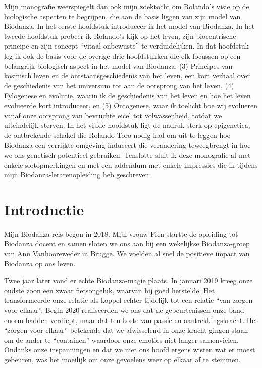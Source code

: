 \documentclass[
  11pt,
]{book}
\begin{document}
Mijn monografie weerspiegelt dan ook mijn zoektocht om Rolando's visie op de biologische aspecten te begrijpen, die aan de basis liggen van zijn model van Biodanza. In het eerste hoofdstuk introduceer ik het model van Biodanza. In het tweede hoofdstuk probeer ik Rolando's kijk op het leven, zijn biocentrische principe en zijn concept ``vitaal onbewuste'' te verduidelijken. In dat hoofdstuk leg ik ook de basis voor de overige drie hoofdstukken die elk focussen op een belangrijk biologisch aspect in het model van Biodanza: (3) Principes van kosmisch leven en de ontstaansgeschiedenis van het leven, een kort verhaal over de geschiedenis van het universum tot aan de oorsprong van het leven, (4) Fylogenese en evolutie, waarin ik de geschiedenis van het leven en hoe het leven evolueerde kort introduceer, en (5) Ontogenese, waar ik toelicht hoe wij evolueren vanaf onze oorsprong van bevruchte eicel tot volwassenheid, totdat we uiteindelijk sterven. In het vijfde hoofdstuk ligt de nadruk sterk op epigenetica, de ontbrekende schakel die Rolando Toro nodig had om uit te leggen hoe Biodanza een verrijkte omgeving induceert die verandering teweegbrengt in hoe we ons genetisch potentieel gebruiken. Tenslotte sluit ik deze monografie af met enkele slotopmerkingen en met een addendum met enkele impressies die ik tijdens mijn Biodanza-lerarenopleiding heb geschreven.

\hypertarget{intro}{%
\chapter{Introductie}\label{intro}}

Mijn Biodanza-reis begon in 2018. Mijn vrouw Fien startte de opleiding tot Biodanza docent en samen sloten we ons aan bij een wekelijkse Biodanza-groep van Ann Vanhooreweder in Brugge. We voelden al snel de positieve impact van Biodanza op ons leven.

Twee jaar later vond er echte Biodanza-magie plaats. In januari 2019 kreeg onze oudste zoon een zwaar fietsongeluk, waarvan hij goed herstelde. Het transformeerde onze relatie als koppel echter tijdelijk tot een relatie ``van zorgen voor elkaar''. Begin 2020 realiseerden we ons dat de gebeurtenissen onze band enorm hadden verdiept, maar dat ten koste van passie en aantrekkingskracht. Het ``zorgen voor elkaar'' betekende dat we afwisselend in onze kracht gingen staan om de ander te ``containen'' waardoor onze emoties niet langer samenvielen. Ondanks onze inspanningen en dat we met ons hoofd ergens wisten wat er moest gebeuren, was het moeilijk om onze gevoelens weer op elkaar af te stemmen.
\end{document}

